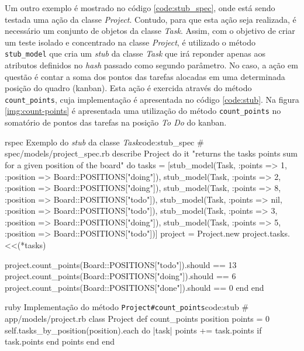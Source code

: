 Um outro exemplo é mostrado no código \ref{code:stub_spec}, onde está sendo testada uma ação da classe \textit{Project}. Contudo, para que esta ação seja realizada, é necessário um conjunto de objetos da classe \textit{Task}. Assim, com o objetivo de criar um teste isolado e concentrado na classe \textit{Project}, é utilizado o método \texttt{stub\_model} que cria um \textit{stub} da classe \textit{Task} que irá reponder apenas aos atributos definidos no \textit{hash} passado como segundo parâmetro. No caso, a ação em questão é contar a soma dos pontos das tarefas alocadas em uma determinada posição do quadro (kanban). Esta ação é exercida através do método \texttt{count\_points}, cuja implementação é apresentada no código \ref{code:stub}. Na figura \ref{img:count-points} é apresentada uma utilização do método \texttt{count\_points} no somatório de pontos das tarefas na posição \textit{To Do} do kanban.

\begin{mycode}{rspec}%
{Exemplo do \textit{stub} da classe \textit{Task}}{code:stub_spec}
# spec/models/project_spec.rb
describe Project do
  it "returns the tasks points sum for a given position of the board" do
    tasks = [stub_model(Task, :points => 1, :position => Board::POSITIONS["doing"]),
             stub_model(Task, :points => 2, :position => Board::POSITIONS["doing"]),
             stub_model(Task, :points => 8, :position => Board::POSITIONS["todo"]),
             stub_model(Task, :points => nil, :position => Board::POSITIONS["todo"]),
             stub_model(Task, :points => 3, :position => Board::POSITIONS["doing"]),
             stub_model(Task, :points => 5, :position => Board::POSITIONS["todo"])]
    project = Project.new
    project.tasks.<<(*tasks)

    project.count_points(Board::POSITIONS["todo"]).should == 13
    project.count_points(Board::POSITIONS["doing"]).should == 6
    project.count_points(Board::POSITIONS["done"]).should == 0
  end
end
\end{mycode}

\begin{mycode}{ruby}%
{Implementação do método \texttt{Project\#count\_points}}{code:stub}
# app/models/project.rb
class Project
  def count_points position
    points = 0
    self.tasks_by_position(position).each do |task|
      points += task.points if task.points
    end
    points
  end
end
\end{mycode}


